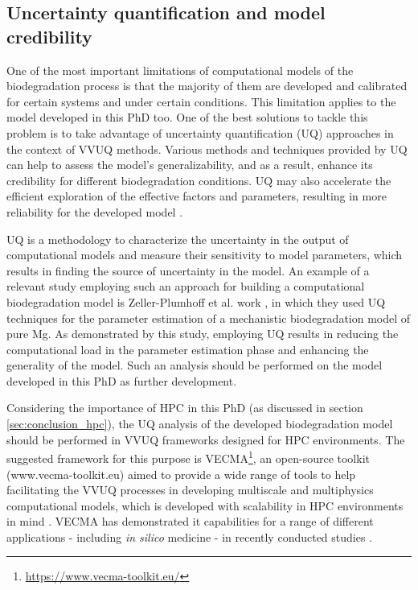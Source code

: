 \subsection{Uncertainty quantification and model credibility } \label{sec:conclusion_vvuq}

One of the most important limitations of computational models of the biodegradation process is that the majority of them are developed and calibrated for certain systems and under certain conditions. This limitation applies to the model developed in this PhD too. One of the best solutions to tackle this problem is to take advantage of uncertainty quantification (\gls{UQ}) approaches in the context of VVUQ methods. Various methods and techniques provided by UQ can help to assess the model's generalizability, and as a result, enhance its credibility for different biodegradation conditions. UQ may also accelerate the efficient exploration of the effective factors and parameters, resulting in more reliability for the developed model \cite{Albaraghtheh2022}.

UQ is a methodology to characterize the uncertainty in the output of computational models and measure their sensitivity to model parameters, which results in finding the source of uncertainty in the model. An example of a relevant study employing such an approach for building a computational biodegradation model is Zeller-Plumhoff et al. work \cite{Zeller-Plumhoff2022}, in which they used UQ techniques for the parameter estimation of a mechanistic biodegradation model of pure Mg. As demonstrated by this study, employing UQ results in reducing the computational load in the parameter estimation phase and enhancing the generality of the model. Such an analysis should be performed on the model developed in this PhD as further development.

Considering the importance of HPC in this PhD (as discussed in section \ref{sec:conclusion_hpc}), the UQ analysis of the developed biodegradation model should be performed in VVUQ frameworks designed for HPC environments. The suggested framework for this purpose is VECMA\footnote{\url{https://www.vecma-toolkit.eu/}}, an open-source toolkit (www.vecma-toolkit.eu) aimed to provide a wide range of tools to help facilitating the VVUQ processes in developing multiscale and multiphysics computational models, which is developed with scalability in HPC environments in mind \cite{Groen2021}. VECMA has demonstrated it capabilities for a range of different applications - including \textit{in silico} medicine - in recently conducted studies \cite{Suleimenova2021,Suter2021,Vassaux2021,Coveney2021}.


